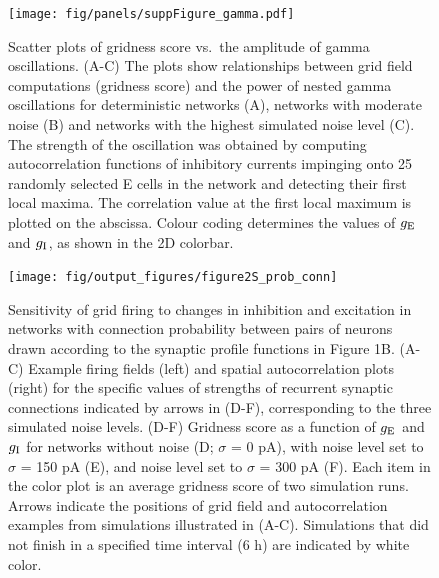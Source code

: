 \documentclass[a4paper,12pt]{article}
\newcommand{\ssc}[3]{\ensuremath{#1_{\text{#2}_{\text{#3}}}}}
\newcommand{\gE      }{\ssc{g}      {\scriptsize{E}}{}}
\newcommand{\gI      }{\ssc{g}      {\scriptsize{I}}{}}
\begin{document}
\clearpage

\begin{figure}[p]
    \internallinenumbers
    \centering
        \texttt{[image: fig/panels/suppFigure\_gamma.pdf]}
    \caption{Scatter plots of gridness score vs.\ the amplitude of gamma
    oscillations. (A-C) The plots show relationships between grid field
    computations (gridness score) and the power of nested gamma oscillations
    for deterministic networks (A), networks with moderate noise (B) and
    networks with the highest simulated noise level (C).
    The strength of the oscillation was obtained
    by computing autocorrelation functions of inhibitory currents impinging
    onto 25 randomly selected E cells in the network and detecting their first
    local maxima. The correlation value at the first local maximum is plotted
    on the abscissa. Colour coding determines the values of $\gE$ and $\gI$, as
    shown in the 2D colorbar.}
\end{figure}

\clearpage

\begin{figure}[p]
    \internallinenumbers
    \centering
        \texttt{[image: fig/output\_figures/figure2S\_prob\_conn]}
    \caption{Sensitivity of grid firing to changes in inhibition and excitation
    in networks with connection probability between pairs of neurons drawn
    according to the synaptic profile functions in Figure 1B. (A-C) Example
    firing fields (left) and spatial autocorrelation plots (right) for the
    specific values of strengths of recurrent synaptic connections indicated by
    arrows in (D-F), corresponding to the three simulated noise levels.  (D-F)
    Gridness score as a function of $\gE$ and $\gI$ for networks without noise (D;
    $\sigma$ = 0 pA), with noise level set to $\sigma$ = 150 pA (E), and noise
    level set to $\sigma$ = 300 pA (F). Each item in the color plot is an
    average gridness score of two simulation runs. Arrows indicate the
    positions of grid field and autocorrelation examples from simulations
    illustrated in (A-C). Simulations that did not finish in a specified time
    interval (6 h) are indicated by white color.}
\end{figure}

\clearpage
\end{document}
